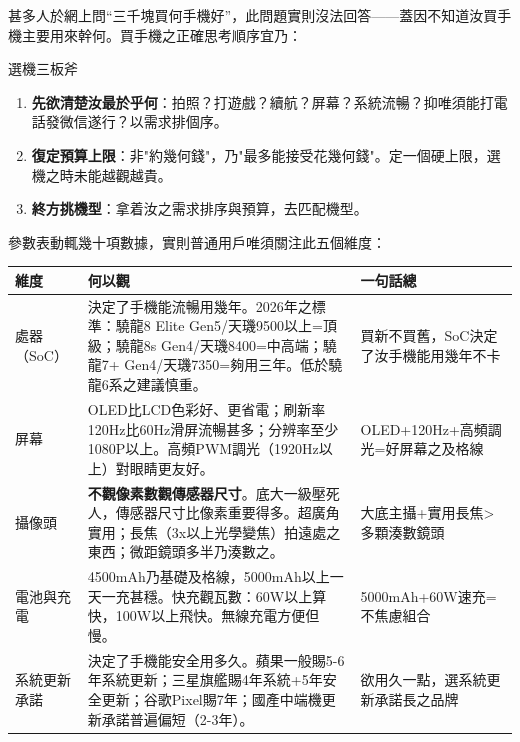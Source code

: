 


甚多人於網上問“三千塊買何手機好”，此問題實則沒法回答——蓋因不知道汝買手機主要用來幹何。買手機之正確思考順序宜乃：

\begin{tcbinfo}{選機三板斧}
\begin{enumerate}
  \item \textbf{先欲清楚汝最於乎何}：拍照？打遊戲？續航？屏幕？系統流暢？抑唯須能打電話發微信遂行？以需求排個序。
  \item \textbf{復定預算上限}：非"約幾何錢"，乃"最多能接受花幾何錢"。定一個硬上限，選機之時未能越觀越貴。
  \item \textbf{終方挑機型}：拿着汝之需求排序與預算，去匹配機型。
\end{enumerate}

\end{tcbinfo}


參數表動輒幾十項數據，實則普通用戶唯須關注此五個維度：

\begin{center}
\begin{tabularx}{\linewidth}{|X|X|X|}
\hline
\textbf{維度} & \textbf{何以觀} & \textbf{一句話總} \tabularnewline
\hline
處器（SoC） & 決定了手機能流暢用幾年。2026年之標準：驍龍8 Elite Gen5/天璣9500以上=頂級；驍龍8s Gen4/天璣8400=中高端；驍龍7+ Gen4/天璣7350=夠用三年。低於驍龍6系之建議慎重。 & 買新不買舊，SoC決定了汝手機能用幾年不卡 \tabularnewline
屏幕 & OLED比LCD色彩好、更省電；刷新率120Hz比60Hz滑屏流暢甚多；分辨率至少1080P以上。高頻PWM調光（1920Hz以上）對眼睛更友好。 & OLED+120Hz+高頻調光=好屏幕之及格線 \tabularnewline
攝像頭 & \textbf{不觀像素數觀傳感器尺寸}。底大一級壓死人，傳感器尺寸比像素重要得多。超廣角實用；長焦（3x以上光學變焦）拍遠處之東西；微距鏡頭多半乃湊數之。 & 大底主攝+實用長焦>多顆湊數鏡頭 \tabularnewline
電池與充電 & 4500mAh乃基礎及格線，5000mAh以上一天一充甚穩。快充觀瓦數：60W以上算快，100W以上飛快。無線充電方便但慢。 & 5000mAh+60W速充=不焦慮組合 \tabularnewline
系統更新承諾 & 決定了手機能安全用多久。蘋果一般賜5-6年系統更新；三星旗艦賜4年系統+5年安全更新；谷歌Pixel賜7年；國產中端機更新承諾普遍偏短（2-3年）。 & 欲用久一點，選系統更新承諾長之品牌 \tabularnewline
\hline
\end{tabularx}
\end{center}

